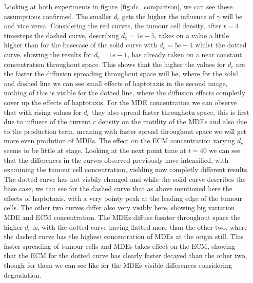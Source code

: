 Looking at both experiments in figure~\ref{fig:dc_comparison}, we can see these assumptions confirmed. The smaller $d_c$ gets the higher the influence of $\gamma$ will be and vice versa. Considering the red curves, the tumour cell density, after $t=4$ timesteps the dashed curve, describing $d_c=1e-5$, takes on a value a little higher than for the basecase of the solid curve with $d_c=5e-4$ whilst the dotted curve, showing the results for $d_c=1e-1$, has already taken on a near constant concentration throughout space. This shows that the higher the values for $d_c$ are the faster the diffusion spreading throughout space will be, where for the solid and dashed line we can see small effects of haptotaxis in the second image, nothing of this is visible for the dotted line, where the diffusion effects completly cover up the effects of haptotaxis. For the MDE concentration we can observe that with rising values for $d_c$ they also spread faster throughotu space, this is first due to influece of the current $c$ density on the motility of the MDEs and also due to the production term, meaning with faster spread throughout space we will get more even prodution of MDEs. The effect on the ECM concentration varying $d_c$ seems to be little at stage. 
Looking at the next point time at $t=40$ we can see that the differences in the curves observed previously have intensified, with examining the tumour cell concentration, yielding now completly different results. The dotted curve has not visbily changed and while the solid curve describes the base case, we can see for the dashed curve that as above mentioned here the effects of haptotaxis, with a very pointy peak at the leading edge of the tumour cells. The other two curves differ also very visibly here, showing big variation MDE and ECM concentration. The MDEs diffuse fasater throughout space the higher $d_c$ is, with the dotted curve having flatted more than the other two, where the dashed curve has the highest concentration of MDEs at the origin still. This faster spreading of tumour cells and MDEs takes effect on the ECM, showing that the ECM for the dotted curve has clearly faster decayed than the other two, though for them we can see like for the MDEs visible differences considering degradation. 
